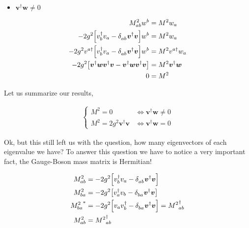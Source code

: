 \begin{itemize}
    \item $\boldsymbol v^\dagger \boldsymbol w\neq0$
\end{itemize}

\begin{align}
    M^2_{ab}w^b&=M^2w_a\nonumber\\
    -2g^2\qty[v_b^{\dagger}v_a
    -\tensor{\delta}{_a_b}\boldsymbol v^\dagger\boldsymbol v]w^b&=M^2w_a\nonumber\\
    -2g^2v^{a\dagger}\qty[v_b^{\dagger}v_a
    -\tensor{\delta}{_a_b}\boldsymbol v^\dagger\boldsymbol v]w^b&=M^2v^{a\dagger}w_a\nonumber\\
    -2g^2\qty[\boldsymbol v^\dagger \boldsymbol w\boldsymbol v^\dagger\boldsymbol v
    -\boldsymbol v^\dagger \boldsymbol w\boldsymbol v^\dagger\boldsymbol v]&=M^2\boldsymbol v^\dagger \boldsymbol w\nonumber\\
    0&=M^2\nonumber
\end{align}

Let us summarize our results,

\begin{align}
    \begin{cases}
        M^2=0&\Leftrightarrow \boldsymbol v^\dagger \boldsymbol w\neq0\\
        M^2=2g^2\boldsymbol v^\dagger\boldsymbol v&\Leftrightarrow\boldsymbol v^\dagger \boldsymbol w=0
    \end{cases}\nonumber
\end{align}

Ok, but this still left us with the question, how many eigenvectors of each eigenvalue we have? To answer this question 
we have to notice a very important fact, the Gauge-Boson mass matrix is Hermitian!

\begin{align}
    M^2_{ab}&=-2g^2\qty[v_b^{\dagger}v_a
    -\tensor{\delta}{_a_b}\boldsymbol v^\dagger\boldsymbol v]\nonumber\\
    M^2_{ba}&=-2g^2\qty[v_a^{\dagger}v_b
    -\tensor{\delta}{_b_a}\boldsymbol v^\dagger\boldsymbol v]\nonumber\\
    {M^2_{ba}}^\ast&=-2g^2\qty[v_av_b^{\dagger}
    -\tensor{\delta}{_b_a}\boldsymbol v^\dagger\boldsymbol v]={M^2}^\dagger_{ab}\nonumber\\
    M^2_{ab}&={M^2}^\dagger_{ab}\nonumber
\end{align}

